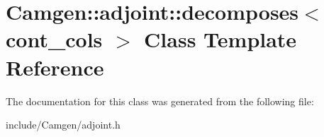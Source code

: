\hypertarget{a00126}{\section{Camgen\-:\-:adjoint\-:\-:decomposes$<$ cont\-\_\-cols $>$ Class Template Reference}
\label{a00126}
}


The documentation for this class was generated from the following file\-:\begin{DoxyCompactItemize}
\item 
include/\-Camgen/adjoint.\-h\end{DoxyCompactItemize}
